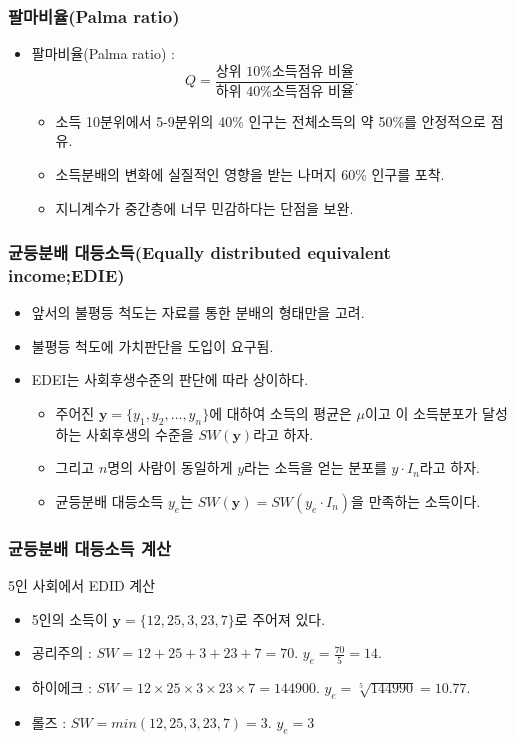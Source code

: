 \documentclass[aspectratio=169,xcolor=dvipsnames,]{beamer}
\newcommand{\y}{\mathbf{y}}
\begin{document}
\begin{frame}[<+->]
\frametitle{팔마비율(Palma ratio)}
    \begin{itemize}
        \item 팔마비율(Palma ratio) :
        $$Q= \frac{ \text{상위 10\% 소득점유 비율} }{ \text{하위 40\% 소득점유 비율} }.$$
            \begin{itemize}
                \item 소득 10분위에서 5-9분위의 40\% 인구는 전체소득의 약 50\%를 안정적으로 점유.
                \item 소득분배의 변화에 실질적인 영향을 받는 나머지 60\% 인구를 포착.
                \item 지니계수가 중간층에 너무 민감하다는 단점을 보완.
            \end{itemize}
    \end{itemize}
\end{frame}

\begin{frame}[<+->]
\frametitle{균등분배 대등소득(Equally distributed equivalent income;EDIE)}
    \begin{itemize}
        \item 앞서의 불평등 척도는 자료를 통한 분배의 형태만을 고려.
        \item 불평등 척도에 가치판단을 도입이 요구됨.
        \item EDEI는 사회후생수준의 판단에 따라 상이하다.
        \begin{itemize}
            \item 주어진 $\mathbf{y} = \{y_1,y_2, \ldots , y_n \}$에 대하여 소득의 평균은 $\mu$이고 이 소득분포가 달성하는 사회후생의 수준을 $SW(\mathbf{y})$라고 하자.
            \item 그리고 $n$명의 사람이 동일하게 $y$라는 소득을 얻는 분포를 $ y \cdot I_n$라고 하자.
            \item 균등분배 대등소득 $y_e$는 $SW(\y) = SW(y_e \cdot I_n)$을 만족하는 소득이다.  
        \end{itemize}
    \end{itemize}
\end{frame}

\begin{frame}[<+->]
\frametitle{균등분배 대등소득 계산}
    \begin{exampleblock}{5인 사회에서 EDID 계산}
        \begin{itemize}
            \item 5인의 소득이 $\mathbf{y} = \{12, 25, 3, 23, 7\}$로 주어져 있다.
            \item 공리주의 : $SW = 12+25+3+23+7 = 70$. $y_e = \frac{70}{5}=14$.
            \item 하이에크 : $SW = 12\times25\times3\times23\times7 = 144900$. $y_e = \sqrt[5]{144990}=10.77$.
            \item 롤즈 : $SW = min(12,25,3,23,7) = 3$. $y_e = 3$
        \end{itemize}
    \end{exampleblock}
\end{frame}
\end{document}
